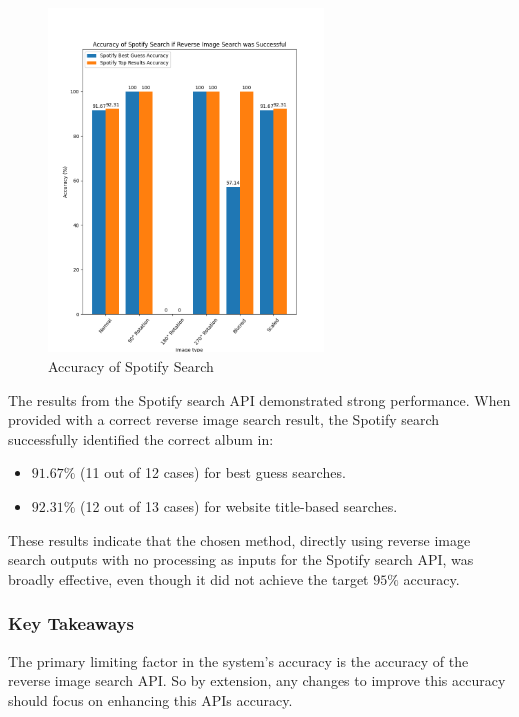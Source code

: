 \begin{figure} [H]
    \centering
    \includegraphics[width=0.65\textwidth]{figures/evaluation_graphs_spotify.png}
    \caption{Accuracy of Spotify Search}
    \label{fig:album-scanning-results-spotify}
\end{figure}

The results from the Spotify search API demonstrated strong performance. When provided with a correct reverse image search result, the Spotify search successfully identified the correct album in:

\begin{itemize}
    \item $91.67\%$ (11 out of 12 cases) for best guess searches.
    \item $92.31\%$ (12 out of 13 cases) for website title-based searches.
\end{itemize}

These results indicate that the chosen method, directly using reverse image search outputs with no processing as inputs for the Spotify search API, was broadly effective, even though it did not achieve the target $95\%$ accuracy.

\subsubsection{Key Takeaways}
The primary limiting factor in the system's accuracy is the accuracy of the reverse image search API. So by extension, any changes to improve this accuracy should focus on enhancing this APIs accuracy.

